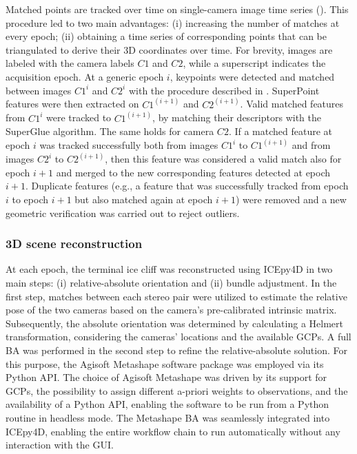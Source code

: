 Matched points are tracked over time on single-camera image time series ().
This procedure led to two main advantages: (i) increasing the number of matches at every epoch; (ii) obtaining a time series of corresponding points that can be
triangulated to derive their 3D coordinates over time.
For brevity, images are labeled with the camera labels \(C1\) and \(C2\), while a superscript indicates the acquisition epoch.
At a generic epoch \(i\), keypoints were detected and matched between images \(C1^i\) and \(C2^i\) with the procedure described in .
SuperPoint features were then extracted on \(C1^{(i+1)}\) and \(C2^{(i+1)}\).
Valid matched features from \(C1^i\) were tracked to \(C1^{(i+1)}\), by matching their descriptors with the SuperGlue algorithm.
The same holds for camera \(C2\).
If a matched feature at epoch \(i\) was tracked successfully both from images \(C1^i\) to \(C1^{(i+1)}\) and from images \(C2^i\) to \(C2^{(i+1)}\), then this feature
was considered a valid match also for epoch \(i+1\) and merged to the new corresponding features detected at epoch \(i+1\).
Duplicate features (e.g., a feature that was successfully tracked from epoch \(i\) to epoch \(i+1\) but also matched again at epoch \(i+1\)) were removed and a new geometric verification was carried out to reject outliers.

\subsubsection{3D scene reconstruction}\label{sec:4:3dreconstruction}

At each epoch, the terminal ice cliff was reconstructed using ICEpy4D in two main steps: (i) relative-absolute orientation and (ii) bundle adjustment.
In the first step, matches between each stereo pair were utilized to estimate the relative pose of the two cameras based on the camera's pre-calibrated intrinsic matrix.
Subsequently, the absolute orientation was determined by calculating a Helmert transformation, considering the cameras' locations and the available GCPs.
A full BA was performed in the second step to refine the relative-absolute solution. For this purpose, the Agisoft Metashape software package was employed via its Python API.
The choice of Agisoft Metashape was driven by its support for GCPs, the possibility to assign different a-priori weights to observations, and the availability of a Python API, enabling the software to be run from a Python routine in headless mode.
The Metashape BA was seamlessly integrated into ICEpy4D, enabling the entire workflow chain to run automatically without any interaction with the GUI.

